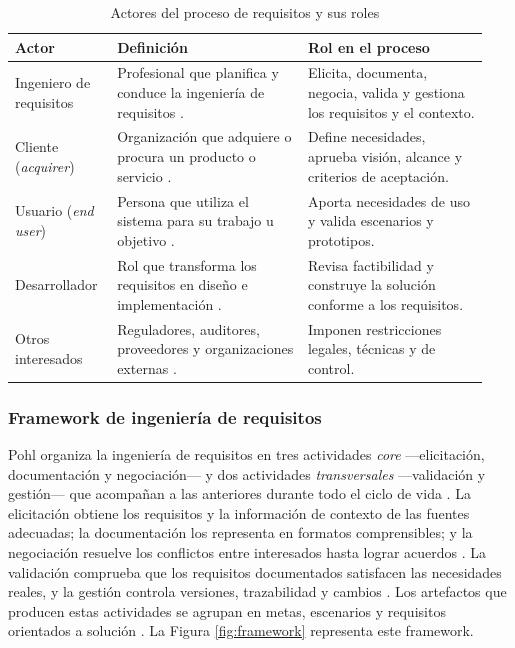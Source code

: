 \documentclass[onecolumn,12pt,a4paper]{IEEEtran}
\begin{document}
\begin{table}[htbp]
\caption{Actores del proceso de requisitos y sus roles}
\label{tab:actores}
\centering
\footnotesize
\begin{tabular}{@{}p{0.20\linewidth}p{0.38\linewidth}p{0.36\linewidth}@{}}
\toprule
\textbf{Actor} & \textbf{Definici\'on} & \textbf{Rol en el proceso}\\
\midrule
Ingeniero de requisitos & Profesional que planifica y conduce la ingenier\'ia de requisitos \cite{pohl2025,ireb2023}. & Elicita, documenta, negocia, valida y gestiona los requisitos y el contexto.\\
Cliente (\emph{acquirer}) & Organizaci\'on que adquiere o procura un producto o servicio \cite{iso29148}. & Define necesidades, aprueba visi\'on, alcance y criterios de aceptaci\'on.\\
Usuario (\emph{end user}) & Persona que utiliza el sistema para su trabajo u objetivo \cite{iso29148}. & Aporta necesidades de uso y valida escenarios y prototipos.\\
Desarrollador & Rol que transforma los requisitos en dise\~no e implementaci\'on \cite{iso29148,pohl2025}. & Revisa factibilidad y construye la soluci\'on conforme a los requisitos.\\
Otros interesados & Reguladores, auditores, proveedores y organizaciones externas \cite{iso29148,pmbok7}. & Imponen restricciones legales, t\'ecnicas y de control.\\
\bottomrule
\end{tabular}
\end{table}

\subsubsection{Framework de ingenier\'ia de requisitos}
Pohl organiza la ingenier\'ia de requisitos en tres actividades \emph{core} ---elicitaci\'on, documentaci\'on y negociaci\'on--- y dos actividades \emph{transversales} ---validaci\'on y gesti\'on--- que acompa\~nan a las anteriores durante todo el ciclo de vida \cite{pohl2025}. La elicitaci\'on obtiene los requisitos y la informaci\'on de contexto de las fuentes adecuadas; la documentaci\'on los representa en formatos comprensibles; y la negociaci\'on resuelve los conflictos entre interesados hasta lograr acuerdos \cite{pohl2025}. La validaci\'on comprueba que los requisitos documentados satisfacen las necesidades reales, y la gesti\'on controla versiones, trazabilidad y cambios \cite{pohl2025,swebok4}. Los artefactos que producen estas actividades se agrupan en metas, escenarios y requisitos orientados a soluci\'on \cite{pohl2025}. La Figura \ref{fig:framework} representa este framework.
\end{document}

